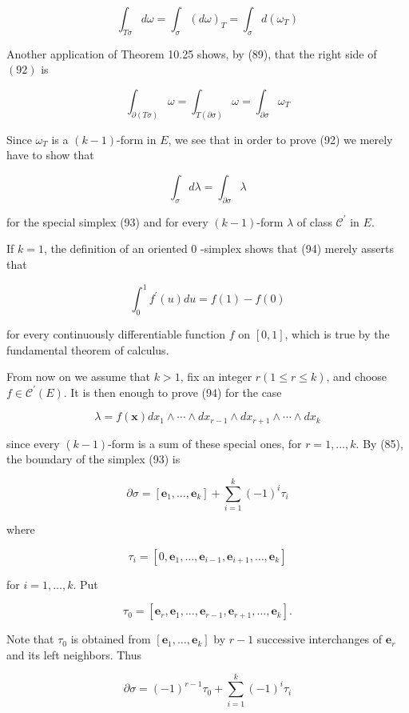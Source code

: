 \documentclass[10pt]{article}
\begin{document}
$$
\int_{T \sigma} d \omega=\int_{\sigma}(d \omega)_{T}=\int_{\sigma} d\left(\omega_{T}\right)
$$

Another application of Theorem 10.25 shows, by (89), that the right side of $(92)$ is

$$
\int_{\partial(T \sigma)} \omega=\int_{T(\partial \sigma)} \omega=\int_{\partial \sigma} \omega_{T}
$$

Since $\omega_{T}$ is a $(k-1)$-form in $E$, we see that in order to prove (92) we merely have to show that

$$
\int_{\sigma} d \lambda=\int_{\partial \sigma} \lambda
$$

for the special simplex (93) and for every $(k-1)$-form $\lambda$ of class $\mathscr{C}^{\prime}$ in $E$.

If $k=1$, the definition of an oriented 0 -simplex shows that (94) merely asserts that

$$
\int_{0}^{1} f^{\prime}(u) d u=f(1)-f(0)
$$

for every continuously differentiable function $f$ on $[0,1]$, which is true by the fundamental theorem of calculus.

From now on we assume that $k>1$, fix an integer $r(1 \leq r \leq k)$, and choose $f \in \mathscr{C}^{\prime}(E)$. It is then enough to prove (94) for the case

$$
\lambda=f(\mathbf{x}) d x_{1} \wedge \cdots \wedge d x_{r-1} \wedge d x_{r+1} \wedge \cdots \wedge d x_{k}
$$

since every $(k-1)$-form is a sum of these special ones, for $r=1, \ldots, k$. By (85), the boundary of the simplex (93) is

$$
\partial \sigma=\left[\mathbf{e}_{1}, \ldots, \mathbf{e}_{k}\right]+\sum_{i=1}^{k}(-1)^{i} \tau_{i}
$$

where

$$
\tau_{i}=\left[0, \mathbf{e}_{1}, \ldots, \mathbf{e}_{i-1}, \mathbf{e}_{i+1}, \ldots, \mathbf{e}_{k}\right]
$$

for $i=1, \ldots, k$. Put

$$
\tau_{0}=\left[\mathbf{e}_{r}, \mathbf{e}_{1}, \ldots, \mathbf{e}_{r-1}, \mathbf{e}_{r+1}, \ldots, \mathbf{e}_{k}\right] .
$$

Note that $\tau_{0}$ is obtained from $\left[\mathbf{e}_{1}, \ldots, \mathbf{e}_{k}\right]$ by $r-1$ successive interchanges of $\mathbf{e}_{r}$ and its left neighbors. Thus

$$
\partial \sigma=(-1)^{r-1} \tau_{0}+\sum_{i=1}^{k}(-1)^{i} \tau_{i}
$$
\end{document}
